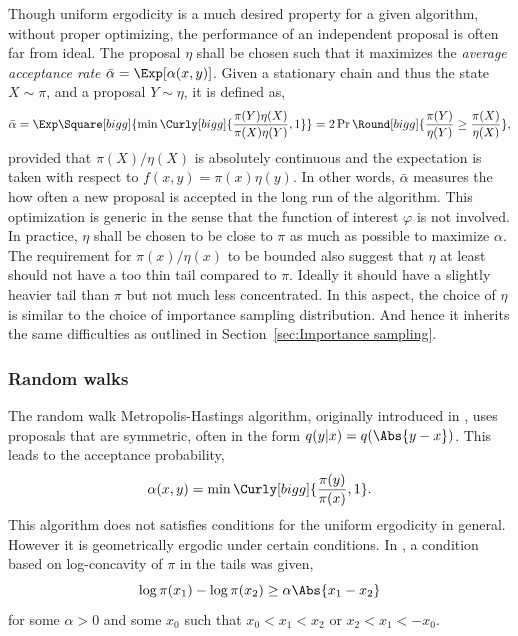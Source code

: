 Though uniform ergodicity is a much desired property for a given algorithm,
without proper optimizing, the performance of an independent proposal is often
far from ideal. The proposal $\eta$ shall be chosen such that it maximizes the
\emph{average acceptance rate} $\bar\alpha = \Exp[\alpha(x,y)]$. Given a
stationary chain and thus the state $X\sim\pi$, and a proposal $Y\sim\eta$, it
is defined as,
\begin{equation}
  \bar\alpha
  = \Exp\Square[bigg]{\min\Curly[bigg]{\frac{\pi(Y)\eta(X)}{\pi(X)\eta(Y)},1}}
  = 2\Pr\Round[bigg]{\frac{\pi(Y)}{\eta(Y)}\ge\frac{\pi(X)}{\eta(X)}},
\end{equation}
provided that $\pi(X)/\eta(X)$ is absolutely continuous and the expectation is
taken with respect to $f(x,y) = \pi(x)\eta(y)$. In other words, $\bar\alpha$
measures the how often a new proposal is accepted in the long run of the
algorithm. This optimization is generic in the sense that the function of
interest $\varphi$ is not involved.  In practice, $\eta$ shall be chosen to be
close to $\pi$ as much as possible to maximize $\alpha$. The requirement for
$\pi(x)/\eta(x)$ to be bounded also suggest that $\eta$ at least should not
have a too thin tail compared to $\pi$. Ideally it should have a slightly
heavier tail than $\pi$ but not much less concentrated. In this aspect, the
choice of $\eta$ is similar to the choice of importance sampling distribution.
And hence it inherits the same difficulties as outlined in
Section~\ref{sec:Importance sampling}.

\subsubsection{Random walks}
\label{ssub:Random walks}

The random walk Metropolis-Hastings algorithm, originally introduced in
\cite{Metropolis:1953ex}, uses proposals that are symmetric, often in the form
$q(y|x) = q(\Abs{y - x})$. This leads to the acceptance probability,
\begin{equation}
  \alpha(x,y) = \min\Curly[bigg]{\frac{\pi(y)}{\pi(x)},1}.
\end{equation}
This algorithm does not satisfies conditions for the uniform ergodicity in
general. However it is geometrically ergodic under certain conditions. In
\cite{Mengersen:1996th}, a condition based on log-concavity of $\pi$ in the
tails was given,
\begin{equation}
  \log\pi(x_1) - \log\pi(x_2) \ge \alpha\Abs{x_1 - x_2}
\end{equation}
for some $\alpha > 0$ and some $x_0$ such that $x_0 < x_1 < x_2$ or $x_2 < x_1
< -x_0$.

